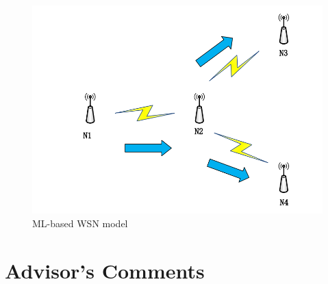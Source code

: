 \documentclass[11pt]{report}
\begin{document}
	\begin{figure}[h!]
		\centering
		\includegraphics[width=\linewidth]{wsn.png}
		\caption{ML-based WSN model}
		\label{1stfig}
	\end{figure}

	
	\section{Advisor's Comments}
	
	
	
	
\end{document}
